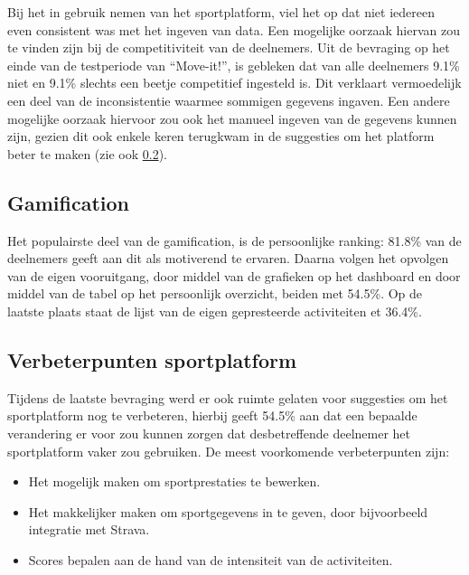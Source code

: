 Bij het in gebruik nemen van het sportplatform, viel het op dat niet iedereen even consistent was met het ingeven van data. Een mogelijke oorzaak hiervan zou te vinden zijn bij de competitiviteit van de deelnemers. Uit de bevraging op het einde van de testperiode van ``Move-it!'', is gebleken dat van alle deelnemers 9.1\% niet en 9.1\% slechts een beetje competitief ingesteld is. Dit verklaart vermoedelijk een deel van de inconsistentie waarmee sommigen gegevens ingaven.
Een andere mogelijke oorzaak hiervoor zou ook het manueel ingeven van de gegevens kunnen zijn, gezien dit ook enkele keren terugkwam in de suggesties om het platform beter te maken (zie ook \ref{ssec:verbeterpunten}).

\subsection{Gamification}

Het populairste deel van de gamification, is de persoonlijke ranking: 81.8\% van de deelnemers geeft aan dit als motiverend te ervaren. Daarna volgen het opvolgen van de eigen vooruitgang, door middel van de grafieken op het dashboard en door middel van de tabel op het persoonlijk overzicht, beiden met 54.5\%. Op de laatste plaats staat de lijst van de eigen gepresteerde activiteiten et 36.4\%.

\subsection{Verbeterpunten sportplatform}
\label{ssec:verbeterpunten}

Tijdens de laatste bevraging werd er ook ruimte gelaten voor suggesties om het sportplatform nog te verbeteren, hierbij geeft 54.5\% aan dat een bepaalde verandering er voor zou kunnen zorgen dat desbetreffende deelnemer het sportplatform vaker zou gebruiken. De meest voorkomende verbeterpunten zijn:

\begin{itemize}
  \item Het mogelijk maken om sportprestaties te bewerken.
  \item Het makkelijker maken om sportgegevens in te geven, door bijvoorbeeld integratie met Strava.
  \item Scores bepalen aan de hand van de intensiteit van de activiteiten.
\end{itemize}